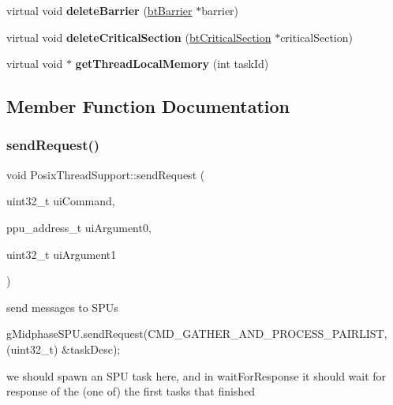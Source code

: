 \begin{DoxyCompactItemize}
virtual void {\bfseries delete\+Barrier} (\hyperlink{classbtBarrier}{bt\+Barrier} $\ast$barrier)
\item 
\mbox{\label{classPosixThreadSupport_ae6d75579596f43a7a32891ab36e0f465}} 
virtual void {\bfseries delete\+Critical\+Section} (\hyperlink{classbtCriticalSection}{bt\+Critical\+Section} $\ast$critical\+Section)
\item 
\mbox{\label{classPosixThreadSupport_a0c1bbe94d966d082f8b5a3ea616ddf35}} 
virtual void $\ast$ {\bfseries get\+Thread\+Local\+Memory} (int task\+Id)
\end{DoxyCompactItemize}


\subsection{Member Function Documentation}
\mbox{\label{classPosixThreadSupport_ab67534f720c0405821ea89cf05dd6b0f}} 
\subsubsection{\texorpdfstring{send\+Request()}{sendRequest()}}
{\footnotesize\ttfamily void Posix\+Thread\+Support\+::send\+Request (\begin{DoxyParamCaption}\item[{uint32\+\_\+t}]{ui\+Command,  }\item[{ppu\+\_\+address\+\_\+t}]{ui\+Argument0,  }\item[{uint32\+\_\+t}]{ui\+Argument1 }\end{DoxyParamCaption})\hspace{0.3cm}{\ttfamily [virtual]}}



send messages to S\+P\+Us 

g\+Midphase\+S\+P\+U.\+send\+Request(\+C\+M\+D\+\_\+\+G\+A\+T\+H\+E\+R\+\_\+\+A\+N\+D\+\_\+\+P\+R\+O\+C\+E\+S\+S\+\_\+\+P\+A\+I\+R\+L\+I\+S\+T, (uint32\+\_\+t) \&task\+Desc);

we should spawn an S\+PU task here, and in \textquotesingle{}wait\+For\+Response\textquotesingle{} it should wait for response of the (one of) the first tasks that finished

